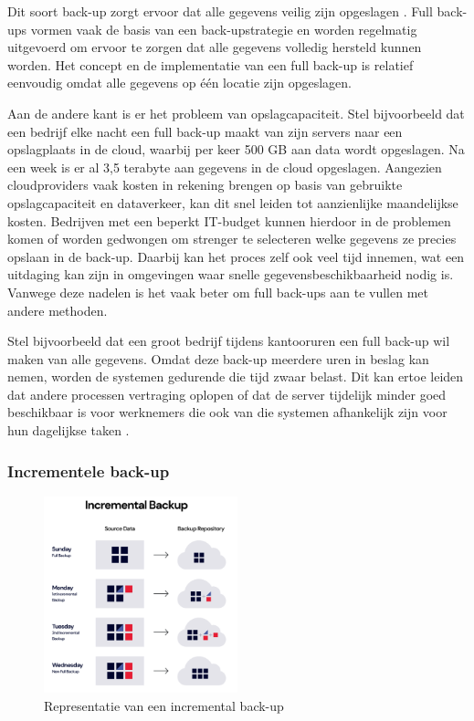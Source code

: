 Dit soort back-up zorgt ervoor dat alle gegevens veilig zijn opgeslagen \autocite{Chervenak1998}. Full back-ups vormen vaak de basis van een back-upstrategie en worden regelmatig uitgevoerd om ervoor te zorgen dat alle gegevens volledig hersteld kunnen worden. Het concept en de implementatie van een full back-up is relatief eenvoudig omdat alle gegevens op één locatie zijn opgeslagen. 

Aan de andere kant is er het probleem van opslagcapaciteit. Stel bijvoorbeeld dat een bedrijf elke nacht een full back-up maakt van zijn servers naar een opslagplaats in de cloud, waarbij per keer 500 GB aan data wordt opgeslagen. Na een week is er al 3,5 terabyte aan gegevens in de cloud opgeslagen. Aangezien cloudproviders vaak kosten in rekening brengen op basis van gebruikte opslagcapaciteit en dataverkeer, kan dit snel leiden tot aanzienlijke maandelijkse kosten. Bedrijven met een beperkt IT-budget kunnen hierdoor in de problemen komen of worden gedwongen om strenger te selecteren welke gegevens ze precies opslaan in de back-up. Daarbij kan het proces zelf ook veel tijd innemen, wat een uitdaging kan zijn in omgevingen waar snelle gegevensbeschikbaarheid nodig is. Vanwege deze nadelen is het vaak beter om full back-ups aan te vullen met andere methoden. 

Stel bijvoorbeeld dat een groot bedrijf tijdens kantooruren een full back-up wil maken van alle gegevens. Omdat deze back-up meerdere uren in beslag kan nemen, worden de systemen gedurende die tijd zwaar belast. Dit kan ertoe leiden dat andere processen vertraging oplopen of dat de server tijdelijk minder goed beschikbaar is voor werknemers die ook van die systemen afhankelijk zijn voor hun dagelijkse taken \autocite{Nelson2011}.

\subsubsection{Incrementele back-up}
\begin{figure}[h] 
    \centering
    \captionsetup{justification=centering}
    \includegraphics[width=0.5\textwidth]{img/incrementb.png}  
    \caption{Representatie van een incremental back-up \autocite{Rivas2022}}   
    \label{fig:incrback-up}           
\end{figure}

